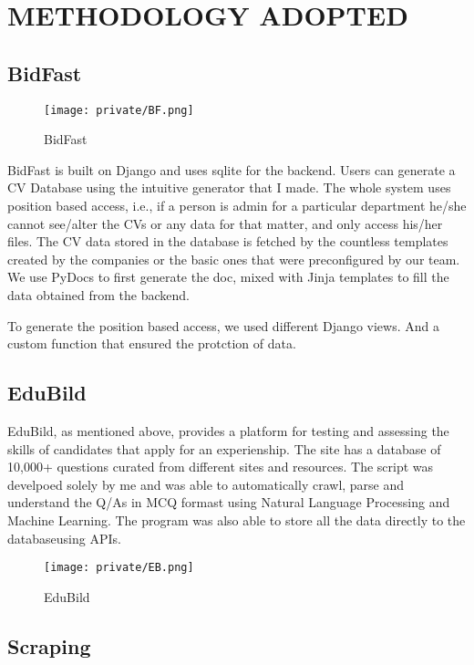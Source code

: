 \documentclass[14pt]{extarticle}
\begin{document}
\newpage
\section{METHODOLOGY ADOPTED}
\subsection{BidFast}

\begin{figure}[hbp]
    \centering
    \caption{BidFast}
    \texttt{[image: private/BF.png]}
\end{figure}

BidFast is built on Django and uses sqlite for the backend. Users can generate a CV Database using the intuitive generator that I made. The whole system uses position based access, i.e., if a person is admin for a particular department he/she cannot see/alter the CVs or any data for that matter, and only access his/her files. The CV data stored in the database is fetched by the countless templates created by the companies or the basic ones that were preconfigured by our team. We use PyDocs to first generate the doc, mixed with Jinja templates to fill the data obtained from the backend.

To generate the position based access, we used different Django views. And a custom function that ensured the protction of data.

\subsection{EduBild}

EduBild, as mentioned above, provides a platform for testing and assessing the skills of candidates that apply for an experienship. The site has a database of 10,000+ questions curated from different sites and resources. The script was develpoed solely by me and was able to automatically crawl, parse and understand the Q/As in MCQ formast using Natural Language Processing and Machine Learning. The program was also able to store all the data directly to the databaseusing APIs.

\begin{figure}[hbp]
    \centering
    \caption{EduBild}
    \texttt{[image: private/EB.png]}
\end{figure}


\newpage
\subsection{Scraping}
\end{document}
